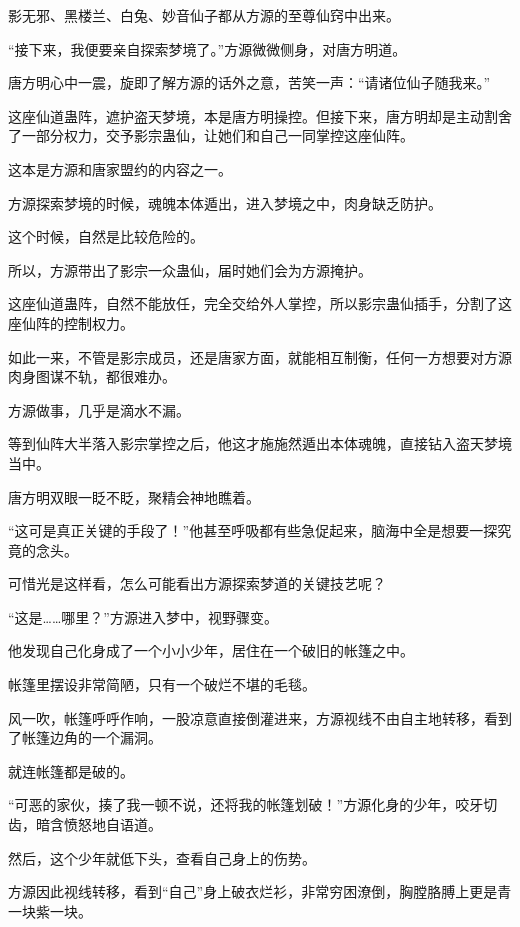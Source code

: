 
\begin{this_body}



影无邪、黑楼兰、白兔、妙音仙子都从方源的至尊仙窍中出来。

“接下来，我便要亲自探索梦境了。”方源微微侧身，对唐方明道。

唐方明心中一震，旋即了解方源的话外之意，苦笑一声：“请诸位仙子随我来。”

这座仙道蛊阵，遮护盗天梦境，本是唐方明操控。但接下来，唐方明却是主动割舍了一部分权力，交予影宗蛊仙，让她们和自己一同掌控这座仙阵。

这本是方源和唐家盟约的内容之一。

方源探索梦境的时候，魂魄本体遁出，进入梦境之中，肉身缺乏防护。

这个时候，自然是比较危险的。

所以，方源带出了影宗一众蛊仙，届时她们会为方源掩护。

这座仙道蛊阵，自然不能放任，完全交给外人掌控，所以影宗蛊仙插手，分割了这座仙阵的控制权力。

如此一来，不管是影宗成员，还是唐家方面，就能相互制衡，任何一方想要对方源肉身图谋不轨，都很难办。

方源做事，几乎是滴水不漏。

等到仙阵大半落入影宗掌控之后，他这才施施然遁出本体魂魄，直接钻入盗天梦境当中。

唐方明双眼一眨不眨，聚精会神地瞧着。

“这可是真正关键的手段了！”他甚至呼吸都有些急促起来，脑海中全是想要一探究竟的念头。

可惜光是这样看，怎么可能看出方源探索梦道的关键技艺呢？

“这是……哪里？”方源进入梦中，视野骤变。

他发现自己化身成了一个小小少年，居住在一个破旧的帐篷之中。

帐篷里摆设非常简陋，只有一个破烂不堪的毛毯。

风一吹，帐篷呼呼作响，一股凉意直接倒灌进来，方源视线不由自主地转移，看到了帐篷边角的一个漏洞。

就连帐篷都是破的。

“可恶的家伙，揍了我一顿不说，还将我的帐篷划破！”方源化身的少年，咬牙切齿，暗含愤怒地自语道。

然后，这个少年就低下头，查看自己身上的伤势。

方源因此视线转移，看到“自己”身上破衣烂衫，非常穷困潦倒，胸膛胳膊上更是青一块紫一块。


\end{this_body}

